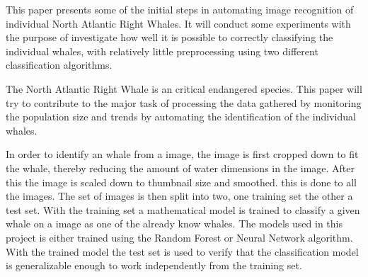 This paper presents some of the initial steps in automating image recognition of individual North Atlantic Right Whales.
It will conduct some experiments with the purpose of investigate how well it is possible to correctly classifying the individual whales, with relatively little preprocessing using two different classification algorithms.

The North Atlantic Right Whale is an critical endangered species. 
This paper will try to contribute to the major task of processing the data gathered by monitoring the population size and trends by automating the identification of the individual whales.

In order to identify an whale from a image, the image is first cropped down to fit the whale, thereby reducing the amount of water dimensions in the image. After this the image is scaled down to thumbnail size and smoothed. this is done to all the images. The set of images is then split into two, one training set the other a test set.
With the training set a mathematical model is trained to classify a given whale on a image as one of the already know whales.
The models used in this project is either trained using the Random Forest or Neural Network algorithm.
With the trained model the test set is used to verify that the classification model is generalizable enough to work independently from the training set.